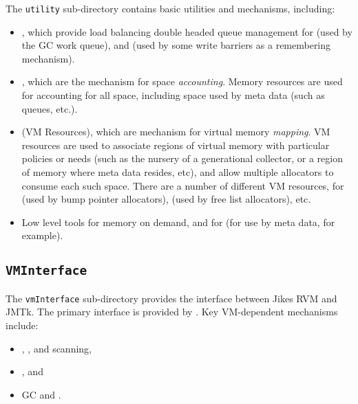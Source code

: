 The \texttt{utility} sub-directory contains basic utilities and
mechanisms, including:
\begin{itemize}
\item {}, which provide load balancing double
  headed queue management for  (used by the GC work queue), and
   (used by some write
  barriers as a remembering mechanism).
\item {}, which are the
  mechanism for space \emph{accounting}.  Memory resources are used
  for accounting for all space, including space used by meta data
  (such as queues, etc.).
\item {} (VM
  Resources), which are mechanism for virtual memory \emph{mapping}.
  VM resources are used to associate regions of virtual memory with
  particular policies or needs (such as the nursery of a generational
  collector, or a region of memory where meta data resides, etc), and
  allow multiple allocators to consume each such space. There are a
  number of different VM resources, for  (used by bump pointer
  allocators), 
  (used by free list allocators), etc.
\item Low level tools for 
  memory on demand, and for  (for use by meta data, for example).
\end{itemize}

\subsection{\texttt{VMInterface}} \label{sssec:vminterface}

The \texttt{vmInterface} sub-directory provides the interface between
Jikes RVM and JMTk.  The primary interface is provided by
.  Key
VM-dependent mechanisms include:

\begin{itemize}
\item {},
  , and
   scanning,
\item {}, and
\item GC  and .
\end{itemize}

